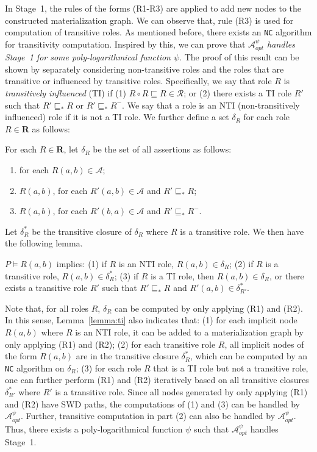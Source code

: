 \documentclass[final,1p,times]{elsarticle}
\begin{document}
In Stage~1, the rules of the forms (R1-R3)
are applied to add new nodes to the constructed materialization graph.
We can observe that, rule (R3) is used for computation of transitive roles.
As mentioned before, there exists an \texttt{NC} algorithm for transitivity computation.
Inspired by this, we can prove that \emph{$\mathcal{A}_{opt}^\psi$
handles Stage~1 for some poly-logarithmical function $\psi$}.
The proof of this result can be shown by separately considering non-transitive roles and
the roles that are transitive or influenced by transitive roles.
Specifically, we say that role $R$ is \emph{transitively influenced} (TI)
if (1) $R\circ R\sqsubseteq R\in\mathcal{R}$; or
(2) there exists a TI role $R'$ such that $R'\sqsubseteq_*R$ or $R'\sqsubseteq_*R^-$.
We say that a role is an NTI (non-transitively influenced) role if it is not a TI role.
We further define a set $\delta_R$ for each role $R\in\textbf{R}$ as follows:

\begin{definition}\label{def:deltaRdhl}
For each $R\in\textbf{R}$, let $\delta_R$ be the set of all assertions as follows:
\begin{enumerate}[leftmargin=4ex,label=\arabic*.]
\item for each $R(a,b)\in\mathcal{A}$;
\item $R(a,b)$, for each $R'(a,b)\in\mathcal{A}$ and $R'\sqsubseteq_{*}R$;
\item $R(a,b)$, for each $R'(b,a)\in\mathcal{A}$ and $R'\sqsubseteq_{*}R^-$.
\end{enumerate}
\end{definition}

Let $\delta^*_R$ be the transitive closure of $\delta_R$ where $R$ is a transitive role.
We then have the following lemma.

\begin{lemma}\label{lemma:ti}
$P\models R(a,b)$ implies: (1) if $R$ is an NTI role, $R(a,b)\in\delta_R$;
(2) if $R$ is a transitive role, $R(a,b)\in\delta^*_{R}$;
(3) if $R$ is a TI role, then $R(a,b)\in\delta_R$, or there exists a transitive
role $R'$ such that $R'\sqsubseteq_* R$ and $R'(a,b)\in\delta^*_{R'}$.
\end{lemma}

Note that, for all roles $R$, $\delta_R$ can be computed by only applying (R1) and (R2).
In this sense, Lemma~\ref{lemma:ti} also indicates that:
(1) for each implicit node $R(a,b)$ where $R$ is an NTI role,
it can be added to a materialization graph by only applying (R1) and (R2);
(2) for each transitive role $R$, all implicit nodes of the form $R(a,b)$ are in the transitive closure $\delta^*_{R}$,
which can be computed by an \texttt{NC} algorithm on $\delta_{R}$;
(3) for each role $R$ that is a TI role but not a transitive role,
one can further perform (R1) and (R2) iteratively based on all transitive closures $\delta^*_{R'}$
where $R'$ is a transitive role.
Since all nodes generated by only applying (R1) and (R2) have SWD paths,
the computations of (1) and (3) can be handled by $\mathcal{A}_{opt}^\psi$.
Further, transitive computation in part (2) can also be handled by $\mathcal{A}_{opt}^\psi$.
Thus, there exists a poly-logarithmical function $\psi$
such that $\mathcal{A}_{opt}^\psi$ handles Stage~1.
\end{document}
